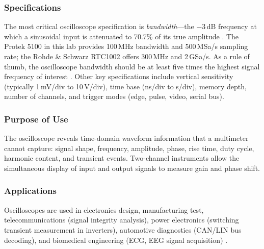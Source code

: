 \subsubsection*{Specifications}
The most critical oscilloscope specification is \textit{bandwidth}---the $-3$\,dB
frequency at which a sinusoidal input is attenuated to 70.7\% of its true amplitude
\cite{tek:oscilloscope}. The Protek 5100 in this lab provides 100\,MHz bandwidth and
500\,MSa/s sampling rate; the Rohde \& Schwarz RTC1002 offers 300\,MHz and 2\,GSa/s.
As a rule of thumb, the oscilloscope bandwidth should be at least five times the highest
signal frequency of interest \cite{keysight:bandwidth}. Other key specifications include
vertical sensitivity (typically 1\,mV/div to 10\,V/div), time base
(ns/div to s/div), memory depth, number of channels, and trigger modes (edge, pulse,
video, serial bus).

\subsubsection*{Purpose of Use}
The oscilloscope reveals time-domain waveform information that a multimeter cannot
capture: signal shape, frequency, amplitude, phase, rise time, duty cycle, harmonic
content, and transient events. Two-channel instruments allow the simultaneous display of
input and output signals to measure gain and phase shift.

\subsubsection*{Applications}
Oscilloscopes are used in electronics design, manufacturing test, telecommunications
(signal integrity analysis), power electronics (switching transient measurement in
inverters), automotive diagnostics (CAN/LIN bus decoding), and biomedical engineering
(ECG, EEG signal acquisition) \cite{wiki:oscilloscope}.
